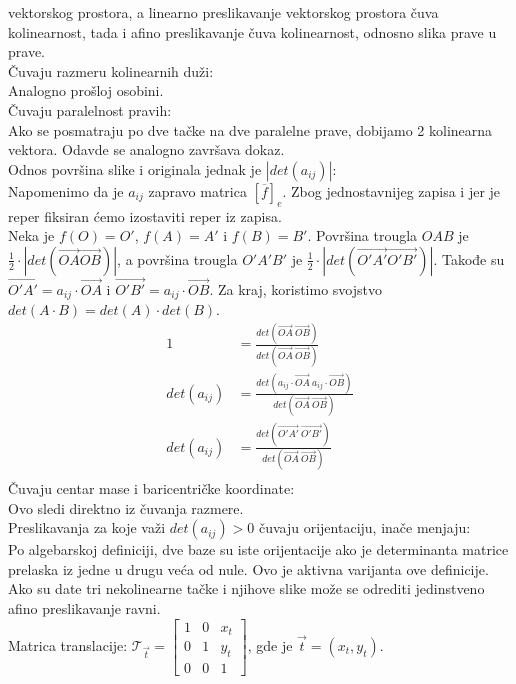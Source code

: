 \documentclass[12pt]{article}
\newcommand{\vek}[1]{\overrightarrow{#1}}
\begin{document}
    vektorskog prostora, a linearno preslikavanje vektorskog prostora
    čuva kolinearnost, tada i afino preslikavanje čuva kolinearnost, odnosno slika prave u prave.\\
    Čuvaju razmeru kolinearnih duži:\\
    Analogno prošloj osobini.\\
    Čuvaju paralelnost pravih:\\
    Ako se posmatraju po dve tačke na dve paralelne prave,
    dobijamo 2 kolinearna vektora. Odavde se analogno završava dokaz.\\
    Odnos površina slike i originala jednak je $|det(a_{ij})|$:\\
    Napomenimo da je $a_{ij}$ zapravo matrica $[\overline{f}]_e$.
    Zbog jednostavnijeg zapisa i jer je reper fiksiran ćemo izostaviti reper iz zapisa.\\
    Neka je $f(O)=O'$, $f(A)=A'$ i $f(B)=B'$. Površina trougla
$OAB$ je $\frac{1}{2}\cdot |det(\vek{OA}\vek{OB})|$,
    a površina trougla $O'A'B'$ je $\frac{1}{2}\cdot |det(\vek{O'A'}\vek{O'B'})|$.
    Takođe su $\vek{O'A'}=a_{ij}\cdot \vek{OA}$ i $\vek{O'B'}=a_{ij}\cdot \vek{OB}$.
    Za kraj, koristimo svojstvo $det(A\cdot B)=det(A)\cdot det(B)$.
    \begin{align*}
        1           & =\frac{det(\vek{OA}\ \vek{OB})}{det(\vek{OA}\ \vek{OB})}                       \\
        det(a_{ij}) & =\frac{det(a_{ij}\cdot\vek{OA}\ a_{ij}\cdot\vek{OB})}{det(\vek{OA}\ \vek{OB})} \\
        det(a_{ij}) & =\frac{det(\vek{O'A'}\ \vek{O'B'})}{det(\vek{OA}\ \vek{OB})}                   \\
    \end{align*}
    Čuvaju centar mase i baricentričke koordinate:\\
    Ovo sledi direktno iz čuvanja razmere.\\
    Preslikavanja za koje važi $det(a_{ij})>0$ čuvaju orijentaciju,
    inače menjaju:\\
    Po algebarskoj definiciji, dve baze su iste orijentacije ako
    je determinanta matrice prelaska iz jedne u drugu veća od
    nule. Ovo je aktivna varijanta ove definicije.\\
    Ako su date tri nekolinearne tačke i njihove slike
    može se odrediti jedinstveno afino preslikavanje ravni.\\
    Matrica translacije:
$\mathcal{T}_{\vek{t}}=\begin{bmatrix}
    1 & 0 & x_t \\
    0 & 1 & y_t \\
    0 & 0 & 1
\end{bmatrix}$, gde je $\vek{t}=(x_t,y_t)$.\\
\end{document}
